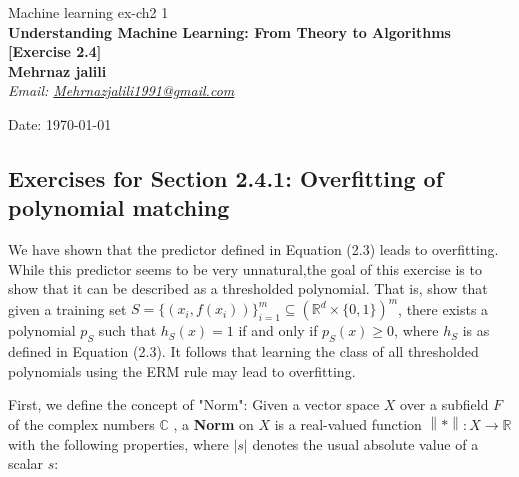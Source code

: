 \documentclass[]{book}
\theoremstyle{definition}
\begin{document}
\begin{center}
{\Large Machine learning \hspace{0.5cm} ex-ch2 1}\\
\textbf{Understanding Machine Learning: From Theory to Algorithms [Exercise 2.4]}\\
\textbf{Mehrnaz jalili}\\ %
\textit{Email: \href{mailto:Mehrnazjalili1991@gmail.com}{Mehrnazjalili1991@gmail.com}} 

Date: \today %
\end{center}

\vspace{0.2 cm}


\subsection*{Exercises for Section 2.4.1: Overfitting of polynomial matching}
We have shown that the predictor defined in Equation (2.3) leads to overfitting. While this predictor seems to be very unnatural,the goal of this exercise is to show that it can be described as a thresholded polynomial. That is, show that given a training set $S=\{(x_i,f(x_i))\}^m_{i=1}\subseteq (\mathbb{R}^d\times \{0,1\})^m$, there exists a polynomial $p_S$ such that $h_S(x)=1$ if and only if $p_S(x)\geq 0$, where $h_S$ is as defined in Equation (2.3). It follows that learning the class of all thresholded polynomials using the ERM rule may lead to overfitting.

\vspace{0.5cm}

First, we define the concept of "Norm": Given a vector space $\displaystyle X$ over a subfield $F$ of the complex numbers $\mathbb C$ , a \textbf{Norm} on $\displaystyle X$ is a real-valued function $\displaystyle \left\| * \right\|:X\to \mathbb R $ with the following properties, where $\displaystyle |s|$ denotes the usual absolute value of a scalar $\displaystyle s$:
\end{document}
